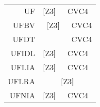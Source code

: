 \begin{table}
{\begin{tabular}{rccc}
    \multicolumn{1}{r|}{UF}         & \multicolumn{1}{c|}{{[}Z3{]}}      & \multicolumn{2}{c|}{CVC4}                                                    \\ \cline{2-4} 
    \multicolumn{1}{r|}{UFBV}       & \multicolumn{2}{c|}{{[}Z3{]}}                                                  & \multicolumn{1}{c|}{CVC4}        \\ \cline{2-4} 
    UFDT                             &                                    &                                           & \multicolumn{1}{|c|}{CVC4}       \\ \cline{2-4} 
    \multicolumn{1}{r|}{UFIDL}      & \multicolumn{1}{c|}{{[}Z3{]}}      & \multicolumn{2}{c|}{CVC4}                                                    \\ \cline{2-4} 
    \multicolumn{1}{r|}{UFLIA}      & \multicolumn{1}{c|}{{[}Z3{]}}      & \multicolumn{2}{c|}{CVC4}                                                    \\ \cline{2-4} 
    \multicolumn{1}{r|}{UFLRA}      & \multicolumn{3}{c|}{{[}Z3{]}}                                                                                     \\ \cline{2-4} 
    \multicolumn{1}{r|}{UFNIA}      & \multicolumn{1}{c|}{{[}Z3{]}}      & \multicolumn{2}{c|}{CVC4}                                                    \\ \cline{2-4} \bottomrule
  \end{tabular}}
\end{table}
